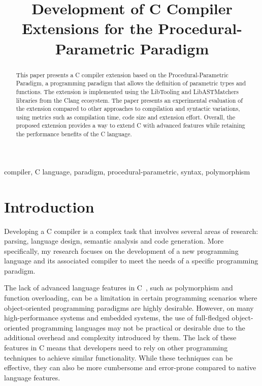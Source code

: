 \documentclass[conference]{IEEEtran}
\title{Development of C Compiler Extensions for the Procedural-Parametric Paradigm}
\author{
  \IEEEauthorblockN{\myname}
  \IEEEauthorblockA{\textit{Faculty of Computer Science, Department of Software Engineering} \\
  \textit{National Research University Higher School of Economics}\\
  Moscow, Russia \\
  AAAAAAAAAAAAAAAAAAAA}
}
\def\mykeywords{compiler, C language, paradigm, procedural-parametric, syntax, polymorphism}
\begin{document}
\maketitle

\begin{abstract}
  This paper presents a C compiler extension based on the Procedural-Parametric Paradigm, a programming paradigm that allows the definition of parametric types and functions.
  The extension is implemented using the LibTooling and LibASTMatchers libraries from the Clang ecosystem.
  The paper presents an experimental evaluation of the extension compared to other approaches to compilation and syntactic variations, using metrics such as compilation time, code size and extension effort.
  Overall, the proposed extension provides a way to extend C with advanced features while retaining the performance benefits of the C language.
\end{abstract}

\begin{IEEEkeywords}\mykeywords\end{IEEEkeywords}

\section{Introduction}

Developing a C compiler is a complex task that involves several areas of research:
parsing, language design, semantic analysis and code generation.
More specifically, my research focuses on the
development of a new programming language and its associated compiler to meet the needs of a specific programming paradigm.

The lack of advanced language features in C~\cite{kernighan1988c}, such as polymorphism and function overloading,
can be a limitation in certain programming scenarios where object-oriented programming paradigms are highly desirable.
However, on many high-performance systems and embedded systems, the use of full-fledged object-oriented programming languages
may not be practical or desirable due to the additional overhead and complexity introduced by them.
The lack of these features in C means that developers need to rely on other programming techniques to achieve similar functionality.
While these techniques can be effective, they can also be more cumbersome and error-prone compared to native language features.
\end{document}

